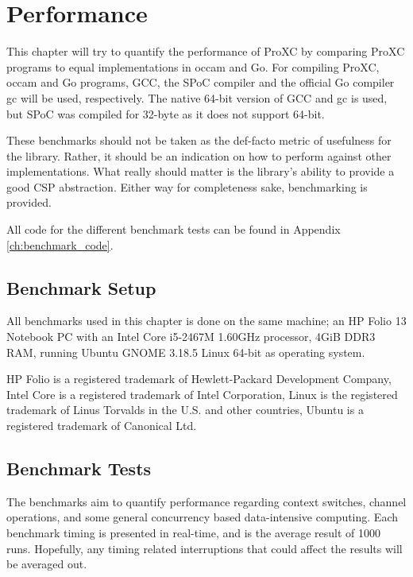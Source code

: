 
\chapter{Performance}
\label{ch:performance}

This chapter will try to quantify the performance of ProXC by comparing ProXC programs to equal implementations in occam and Go. For compiling ProXC, occam and Go programs, GCC, the SPoC compiler and the official Go compiler gc will be used, respectively. The native 64\hyp{}bit version of GCC and gc is used, but SPoC was compiled for 32\hyp{}byte as it does not support 64\hyp{}bit. 

These benchmarks should not be taken as the def\hyp{}facto metric of usefulness for the library. Rather, it should be an indication on how to perform against other implementations. What really should matter is the library's ability to provide a good CSP abstraction. Either way for completeness sake, benchmarking is provided. 

All code for the different benchmark tests can be found in Appendix \ref{ch:benchmark_code}. 

\section{Benchmark Setup}

All benchmarks used in this chapter is done on the same machine; an HP\textregistered{} Folio 13 Notebook PC with an Intel\textregistered{} Core\texttrademark{} i5-2467M 1.60GHz processor, 4GiB DDR3 RAM, running Ubuntu GNOME 3.18.5 Linux\textregistered{} 64-bit as operating system.

HP Folio is a registered trademark of Hewlett\hyp{}Packard Development Company, Intel Core is a registered trademark of Intel Corporation, Linux is the registered trademark of Linus Torvalds in the U.S. and other countries, Ubuntu is a registered trademark of Canonical Ltd.

\section{Benchmark Tests}

The benchmarks aim to quantify performance regarding context switches, channel operations, and some general concurrency based data\hyp{}intensive computing. Each benchmark timing is presented in real\hyp{}time, and is the average result of 1000 runs. Hopefully, any timing related interruptions that could affect the results will be averaged out. 

